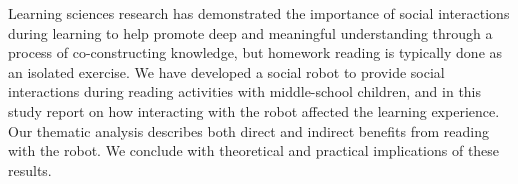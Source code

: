 \documentclass{article}
\title{     }
\author{     }
\date{     }
\begin{document}
Learning sciences research has demonstrated the importance of social interactions during learning to help promote deep and meaningful understanding through a process of co-constructing knowledge, but homework reading is typically done as an isolated exercise. We have developed a social robot to provide social interactions during reading activities with middle-school children, and in this study report on how interacting with the robot affected the learning experience. Our thematic analysis describes both direct and indirect benefits from reading with the robot. We conclude with theoretical and practical implications of these results.
\end{document}
